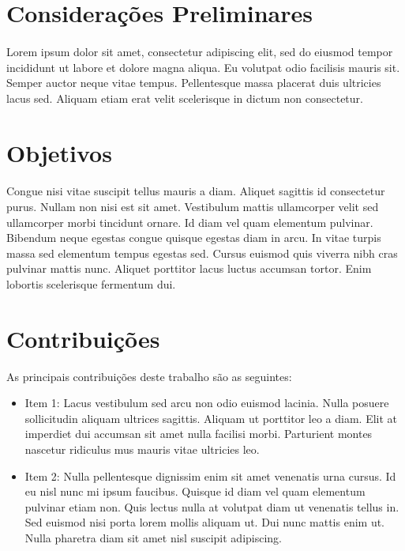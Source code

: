 \section{Considerações Preliminares}

\paragraph{}
Lorem ipsum dolor sit amet, consectetur adipiscing elit, sed do eiusmod tempor incididunt ut labore et dolore magna aliqua. Eu volutpat odio facilisis mauris sit. Semper auctor neque vitae tempus. Pellentesque massa placerat duis ultricies lacus sed. Aliquam etiam erat velit scelerisque in dictum non consectetur.

\section{Objetivos}

\paragraph{}
Congue nisi vitae suscipit tellus mauris a diam. Aliquet sagittis id consectetur purus. Nullam non nisi est sit amet. Vestibulum mattis ullamcorper velit sed ullamcorper morbi tincidunt ornare. Id diam vel quam elementum pulvinar. Bibendum neque egestas congue quisque egestas diam in arcu. In vitae turpis massa sed elementum tempus egestas sed. Cursus euismod quis viverra nibh cras pulvinar mattis nunc. Aliquet porttitor lacus luctus accumsan tortor. Enim lobortis scelerisque fermentum dui.

\section{Contribuições}

As principais contribuições deste trabalho são as seguintes:

\begin{itemize}
    \item Item 1: Lacus vestibulum sed arcu non odio euismod lacinia. Nulla posuere sollicitudin aliquam ultrices sagittis. Aliquam ut porttitor leo a diam. Elit at imperdiet dui accumsan sit amet nulla facilisi morbi. Parturient montes nascetur ridiculus mus mauris vitae ultricies leo.
    \item Item 2: Nulla pellentesque dignissim enim sit amet venenatis urna cursus. Id eu nisl nunc mi ipsum faucibus. Quisque id diam vel quam elementum pulvinar etiam non. Quis lectus nulla at volutpat diam ut venenatis tellus in. Sed euismod nisi porta lorem mollis aliquam ut. Dui nunc mattis enim ut. Nulla pharetra diam sit amet nisl suscipit adipiscing.
\end{itemize}